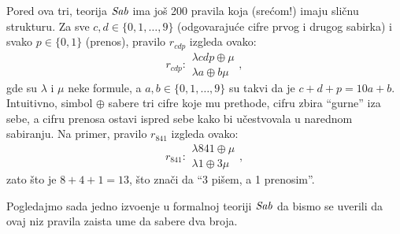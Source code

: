 Pored ova tri, teorija $\mathit{Sab}$ ima jo\v s 200 pravila koja (sre\'com!) imaju sli\v cnu strukturu. Za sve
$c, d \in \{0, 1, \ldots, 9\}$ (odgovaraju\'ce cifre prvog i drugog sabirka) i svako
$p \in \{0, 1\}$ (prenos), pravilo $r_{cdp}$ izgleda ovako:
$$
  r_{cdp} : \begin{array}{c}
    \lambda cdp \oplus \mu\\ \hline
    \lambda a \oplus b \mu
  \end{array},
$$
gde su $\lambda$ i $\mu$ neke formule, a $a, b \in \{0, 1, \ldots, 9\}$ su takvi da je $c + d + p = 10 a + b$.
Intuitivno, simbol $\oplus$ sabere tri cifre koje mu prethode, cifru zbira ``gurne'' iza sebe, a cifru prenosa
ostavi ispred sebe kako bi u\v cestvovala u narednom sabiranju. Na primer, pravilo $r_{841}$ izgleda ovako:
$$
  r_{841} : \begin{array}{c}
    \lambda 841 \oplus \mu\\ \hline
    \lambda 1 \oplus 3 \mu
  \end{array},
$$
zato \v sto je $8 + 4 + 1 = 13$, \v sto zna\v ci da ``3 pi\v sem, a 1 prenosim''.

Pogledajmo sada jedno izvo\dj enje u formalnoj teoriji $\mathit{Sab}$ da bismo se uverili da ovaj niz pravila
zaista ume da sabere dva broja.

\begin{center}
  
\end{center}



\endinput

